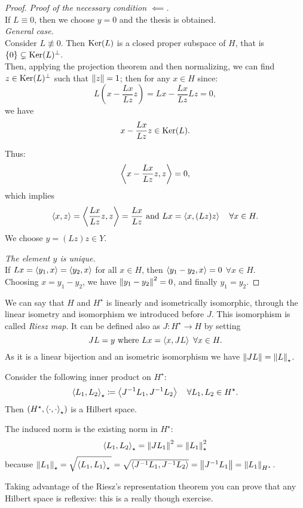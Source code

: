 \begin{proof}\textit{Proof of the necessary condition $\impliedby$.}\\
	If $L \equiv 0$, then we choose $y=0$ and the thesis is obtained.\\
	\textit{General case.}\\	
	Consider $L \not \equiv 0$. Then $\operatorname{Ker}(L)$ is a closed proper subspace of $H$, that is $\{0\} \subsetneq \operatorname{Ker}(L)^\perp$.\\
	Then, applying the projection theorem and then normalizing, we can find $z \in \operatorname{Ker}(L)^\perp$ such that $\left\lVert z\right\rVert=1$; then for any $x \in H$  since:
	$$L\left( x-\frac{Lx}{Lz}z \right)
	= Lx - \frac{Lx}{Lz} Lz =0,$$
	we have
	$$x- \frac{Lx}{Lz} z
	\in \operatorname{Ker}(L).$$
	
	Thus:
	$$\left\langle x - \frac{Lx}{Lz}z, z\right\rangle = 0,$$
	which implies 
	$$\left\langle x, z\right\rangle = \left\langle\frac{Lx}{Lz}z,z\right\rangle = \frac{Lx}{Lz} \text{ and } Lx = \left\langle x, (Lz)z\right\rangle \quad \forall x \in H.$$ 
	We choose $y =  (Lz)z \in Y$.
	
	\textit{The element $y$ is unique.}\\
	If $Lx = \left\langle y_1, x\right\rangle = \left\langle y_2, x\right\rangle$ for all $x \in H$, then $ \left\langle y_1-y_2, x\right\rangle = 0$ $\forall x \in H$.\\
	Choosing $x = y_1 - y_2$, we have $\left\lVert y_1-y_2\right\rVert^2=0$, and finally $y_1 = y_2$.
\end{proof}

We can say that $H$ and $H^\star$ is linearly and isometrically isomorphic, through the linear isometry and isomorphism we introduced before $J$. This isomorphism is called \emph{Riesz map}. It can be defined also as $J: H^\star \to H$ by setting
$$JL = y \text{ where } Lx = \left\langle x, JL\right\rangle \ \forall x \in H.$$
As it is a linear bijection and an isometric isomorphism we have $\left\lVert JL\right\rVert = \left\lVert L\right\rVert_\star$.


\begin{prop}
	Consider the following inner product on $H^\star$:
	$$\left\langle L_1, L_2\right\rangle_\star \coloneqq \left\langle J^{-1}L_1, J^{-1} L_2\right\rangle \quad \forall L_1, L_2 \in H^\star.$$
	Then $(H^\star, \left\langle\cdot, \cdot\right\rangle_\star)$ is a Hilbert space.
\end{prop}

The induced norm is the existing norm in $H^\star$:
$$\left\langle L_1, L_2\right\rangle_\star = \left\lVert JL_1\right\rVert^2 = \left\lVert L_1\right\rVert^2_\star$$
because  $\norm{L_1}_\star =
\sqrt{\sca{L_1, L_1}_\star \vphantom{\tilde L}} =
\sqrt{\sca{J^{-1}L_1, J^{-1} L_2} } 
= \norm{J^{-1} L_1} = \norm{L_1}_{H^\star}$.

Taking advantage of the Riesz's representation theorem you can prove that any Hilbert space is reflexive: this is  a really though exercise.
